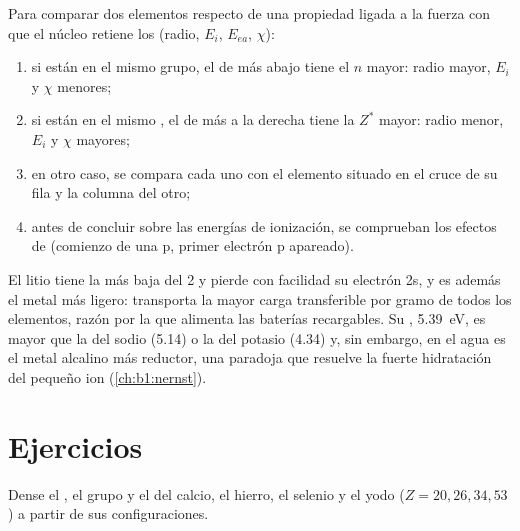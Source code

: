\begin{method}\label{met:b1:periodicity:predict}
Para comparar dos elementos respecto de una propiedad ligada a la fuerza
con que el núcleo retiene los  (radio, $E_i$, $E_{ea}$, $\chi$):
\begin{enumerate}
  \item si están en el mismo grupo, el de más abajo tiene el $n$ mayor:
        radio mayor, $E_i$ y $\chi$ menores;
  \item si están en el mismo , el de más a la derecha tiene la
        $Z^{*}$ mayor: radio menor, $E_i$ y $\chi$ mayores;
  \item en otro caso, se compara cada uno con el elemento situado en el
        cruce de su fila y la columna del otro;
  \item antes de concluir sobre las energías de ionización, se comprueban
        los efectos de  (comienzo de una  p, primer
        electrón p apareado).
\end{enumerate}
\end{method}

\begin{example}\label{ex:b1:periodicity:lithium}
El litio tiene la  más baja del  2 y pierde con
facilidad su electrón 2s, y es además el metal más ligero: transporta la
mayor carga transferible por gramo de todos los elementos, razón por la
que alimenta las baterías recargables. Su ,
\qty{5.39}{eV}, es mayor que la del sodio (5.14) o la del potasio (4.34)
y, sin embargo, en el agua es el metal alcalino más reductor, una paradoja
que resuelve la fuerte hidratación del pequeño ion 
(\cref{ch:b1:nernst}).
\end{example}

\section{Ejercicios}

\begin{exercise}[$\star$]\label{exo:b1:periodicity:1}
Dense el , el grupo y el  del calcio, el hierro, el selenio
y el yodo ($Z = 20, 26, 34, 53$) a partir de sus configuraciones.
\end{exercise}

